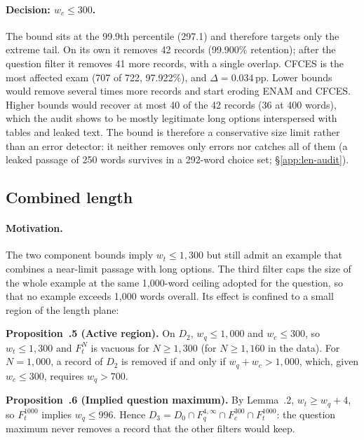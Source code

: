 \paragraph{Decision: $w_c \le 300$.} The bound sits at the 99.9th percentile
(297.1) and therefore targets only the extreme tail. On its own it removes 42
records (99.900\% retention); after the question filter it removes 41 more
records, with a single overlap. CFCES is the most affected exam (707 of 722,
97.922\%), and $\Delta = 0.034$\,pp. Lower bounds would remove several times
more records and start eroding ENAM and CFCES. Higher bounds would recover at
most 40 of the 42 records (36 at 400 words), which the audit shows to be
mostly legitimate long options interspersed with tables and leaked text. The
bound is therefore a conservative size limit rather than an error detector:
it neither removes only errors nor catches all of them (a leaked passage of
250 words survives in a 292-word choice set; \S\ref{app:len-audit}).

\subsection{Combined length}
\label{app:len-total}

\paragraph{Motivation.} The two component bounds imply $w_t \le 1{,}300$ but
still admit an example that combines a near-limit passage with long options.
The third filter caps the size of the whole example at the same 1,000-word
ceiling adopted for the question, so that no example exceeds 1,000 words
overall. Its effect is confined to a small region of the length plane:

\medskip\noindent\textbf{Proposition~\thesection.5 (Active region).} On
$D_2$, $w_q \le 1{,}000$ and $w_c \le 300$, so $w_t \le 1{,}300$ and $F_t^{N}$
is vacuous for $N \ge 1{,}300$ (for $N \ge 1{,}160$ in the data). For
$N = 1{,}000$, a record of $D_2$ is removed if and only if
$w_q + w_c > 1{,}000$, which, given $w_c \le 300$, requires $w_q > 700$.

\medskip\noindent\textbf{Proposition~\thesection.6 (Implied question
maximum).} By Lemma~\thesection.2, $w_t \ge w_q + 4$, so $F_t^{1000}$ implies
$w_q \le 996$. Hence
$D_3 = D_0 \cap F_q^{4,\infty} \cap F_c^{300} \cap F_t^{1000}$: the question
maximum never removes a record that the other filters would keep.

